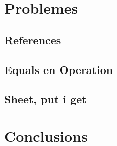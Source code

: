 \documentclass{article}
\begin{document}
	\section{Problemes}
	\subsection{References}
	\subsection{Equals en Operation}
	\subsection{Sheet, put i get}
	\section{Conclusions}
\end{document}
